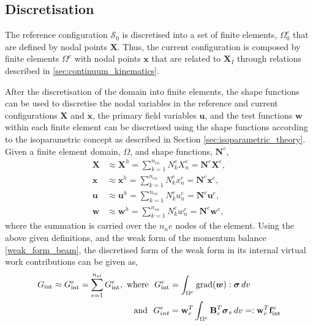 \documentclass[../main.tex]{subfiles}
\begin{document}
\subsection{Discretisation} \label{sec:nonlinear_discretisation}
The reference configuration $\mathcal{S}_{0}$ is discretised into a set of finite elements, $\Omega_{0}^{e}$ that are defined by nodal points
 $\boldsymbol{X}$. Thus, the current configuration is composed by finite elements $\Omega^{e}$ with nodal points $\boldsymbol{x}$
 that are related to $\boldsymbol{X}_{I}$ through relations described in \ref{sec:continuum_kinematics}. 

After the discretisation of the domain into finite elements, the shape functions can be used to discretise the nodal variables
 in the reference and current configurations $\boldsymbol{X}$ and $\boldsymbol{x}$, the primary field variables $\boldsymbol{u}$,
 and the test functions $\boldsymbol{w}$ within each finite element can be discretised using the shape functions according to the isoparametric concept
 as described in Section \ref{sec:isoparametric_theory}. 
 Given a finite element domain, $\Omega$, and shape functions, $\boldsymbol{N}^{e}$,
 \begin{align} \label{nodal_discretisations}
    \boldsymbol{X} &\approx \boldsymbol{X}^{h} = \sum^{n_{en}}_{k=1} N^{e}_{k} X^{e}_{n} = \mathbf{N}^{e}\mathbf{X}^{e},\\
    \boldsymbol{x} &\approx \boldsymbol{x}^{h} = \sum^{n_{en}}_{k=1} N^{e}_{k} x^{e}_{n} = \mathbf{N}^{e}\mathbf{x}^{e},\\
    \boldsymbol{u} &\approx \boldsymbol{u}^{h} = \sum^{n_{en}}_{k=1} N^{e}_{k} u^{e}_{n} = \mathbf{N}^{e}\mathbf{u}^{e},\\
    \boldsymbol{w} &\approx \boldsymbol{w}^{h} = \sum^{n_{en}}_{k=1} N^{e}_{k} w^{e}_{n} = \mathbf{N}^{e}\mathbf{w}^{e},
 \end{align}
where the summation is carried over the $n_ne$ nodes of the element. 
Using the above given definitions, and the weak form of the momentum balance \eqref{weak_form_beam}, the discretised form of the weak form
 in its internal virtual work contributions can be given as,
\begin{align} \label{discretised_g_int}
    G_{\text{int}} \approx G^{e}_{\text{int}} = \sum^{n_{el}}_{e=1} G^{e}_{\text{int}}, \,\,\text{where } \, \, G^{e}_{\text{int}} &= \int_{\Omega^{e}} \mathrm{grad}(\boldsymbol{w}) : \boldsymbol{\sigma} \,dv \notag\\
    \text{and }\,\, G^{e}_{int} &= \mathbf{w}^{T}_{e} \int_{\Omega^{e}}{\mathbf{B}^{T}_{e}} \boldsymbol{\sigma}_{v} \,dv =: \mathbf{w}^{T}_{e} \mathbf{f}^{e}_{\text{int}}
\end{align}
\end{document}
